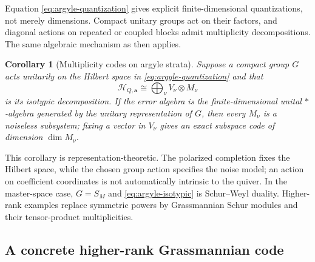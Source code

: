 \documentclass[11pt]{article}
\newtheorem{corollary}[theorem]{Corollary}
\theoremstyle{definition}
\theoremstyle{remark}
\newcommand{\cH}{\mathcal H}
\begin{document}
Equation \eqref{eq:argyle-quantization} gives explicit finite-dimensional quantizations, not merely dimensions.  Compact unitary groups act on their factors, and diagonal actions on repeated or coupled blocks admit multiplicity decompositions.  The same algebraic mechanism as  then applies.

\begin{corollary}[Multiplicity codes on argyle strata]\label{cor:argyle-multiplicity}
Suppose a compact group $G$ acts unitarily on the Hilbert space in \eqref{eq:argyle-quantization} and that
\begin{equation}\label{eq:argyle-isotypic}
 \cH_{Q,\boldsymbol a}
 \cong\bigoplus_\nu V_\nu\otimes M_\nu
\end{equation}
is its isotypic decomposition.  If the error algebra is the finite-dimensional
unital $*$-algebra generated by the unitary representation of $G$, then every
$M_\nu$ is a noiseless subsystem; fixing a vector in $V_\nu$ gives an exact
subspace code of dimension $\dim M_\nu$.
\end{corollary}

This corollary is representation-theoretic.  The polarized completion fixes the Hilbert space, while the chosen group action specifies the noise model; an action on coefficient coordinates is not automatically intrinsic to the quiver.  In the master-space case, $G=S_M$ and \eqref{eq:argyle-isotypic} is Schur--Weyl duality.  Higher-rank examples replace symmetric powers by Grassmannian Schur modules and their tensor-product multiplicities.

\subsection{A concrete higher-rank Grassmannian code}
\end{document}

